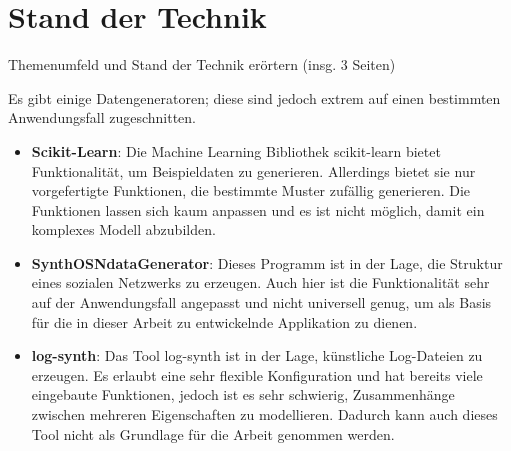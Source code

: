 
\chapter{Stand der Technik}

Themenumfeld und Stand der Technik erörtern (insg. 3 Seiten)

Es gibt einige Datengeneratoren; diese sind jedoch extrem auf einen bestimmten Anwendungsfall zugeschnitten.

\begin{itemize}
    \item \textbf{Scikit-Learn}: Die Machine Learning Bibliothek scikit-learn bietet Funktionalität, um Beispieldaten zu generieren. Allerdings bietet sie nur vorgefertigte Funktionen, die bestimmte Muster zufällig generieren. Die Funktionen lassen sich kaum anpassen und es ist nicht möglich, damit ein komplexes Modell abzubilden. \cite{scikit-learn:paper, scikit-learn:generator}
    \item \textbf{SynthOSNdataGenerator}: Dieses Programm ist in der Lage, die Struktur eines sozialen Netzwerks zu erzeugen. Auch hier ist die Funktionalität sehr auf der Anwendungsfall angepasst und nicht universell genug, um als Basis für die in dieser Arbeit zu entwickelnde Applikation zu dienen. \cite{synthosndatagenerator}
    \item \textbf{log-synth}: Das Tool log-synth ist in der Lage, künstliche Log-Dateien zu erzeugen. Es erlaubt eine sehr flexible Konfiguration und hat bereits viele eingebaute Funktionen, jedoch ist es sehr schwierig, Zusammenhänge zwischen mehreren Eigenschaften zu modellieren. Dadurch kann auch dieses Tool nicht als Grundlage für die Arbeit genommen werden. \cite{logsynth}
\end{itemize}
